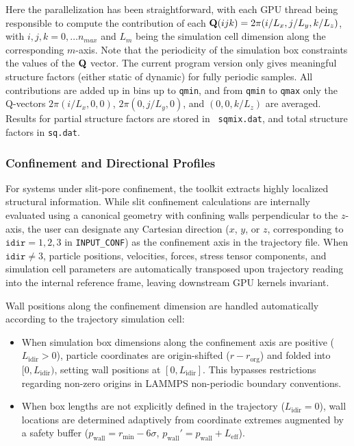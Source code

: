\documentclass[final,1p,times]{elsarticle}
\begin{document}
Here the parallelization has been straightforward, with each GPU
thread being responsible to compute the contribution of each ${\bf
  Q}(ijk) = 2\pi(i/L_x,j/L_y,k/L_z)$, with $i,j,k =0,\ldots n_{max}$
and $L_m$ being the simulation cell dimension along the corresponding
$m$-axis. Note that the periodicity of the simulation box constraints
the values of the ${\bf Q}$ vector. The current program version only
gives meaningful structure factors (either static of dynamic) for
fully periodic samples. All contributions are added up in bins up to
{\tt qmin}, and from {\tt qmin} to {\tt qmax} only the Q-vectors
$2\pi(i/L_x,0,0)$, $2\pi(0,j/L_y,0)$, and $(0,0,k/L_z)$ are
averaged. Results for partial structure factors are stored in {\tt
  sqmix.dat}, and total structure factors in {\tt sq.dat}. 

\subsubsection{Confinement and Directional Profiles}
For systems under slit-pore confinement, the toolkit extracts highly localized structural information. While slit confinement calculations are internally evaluated using a canonical geometry with confining walls perpendicular to the $z$-axis, the user can designate any Cartesian direction ($x$, $y$, or $z$, corresponding to $\texttt{idir} = 1, 2, 3$ in \texttt{INPUT\_CONF}) as the confinement axis in the trajectory file. When $\texttt{idir} \neq 3$, particle positions, velocities, forces, stress tensor components, and simulation cell parameters are automatically transposed upon trajectory reading into the internal reference frame, leaving downstream GPU kernels invariant.

Wall positions along the confinement dimension are handled automatically according to the trajectory simulation cell:
\begin{itemize}
    \item When simulation box dimensions along the confinement axis are positive ($L_{\text{idir}} > 0$), particle coordinates are origin-shifted ($r - r_{\text{org}}$) and folded into $[0, L_{\text{idir}})$, setting wall positions at $[0, L_{\text{idir}}]$. This bypasses restrictions regarding non-zero origins in LAMMPS non-periodic boundary conventions.
    \item When box lengths are not explicitly defined in the trajectory ($L_{\text{idir}} = 0$), wall locations are determined adaptively from coordinate extremes augmented by a safety buffer ($p_{\text{wall}} = r_{\min} - 6\sigma$, $p_{\text{wall}}' = p_{\text{wall}} + L_{\text{eff}}$).
\end{itemize}
\end{document}
